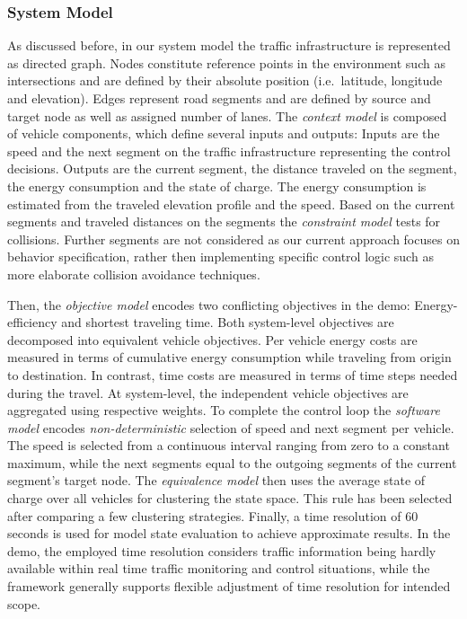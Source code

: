\documentclass[conference]{../cls/IEEEtran}
\begin{document}
\subsubsection*{System Model}

As discussed before, in our system model the traffic infrastructure is
represented as directed graph. Nodes constitute reference points in the
environment such as intersections and are defined by their absolute position
(i.e.\ latitude, longitude and elevation). Edges represent road segments and are
defined by source and target node as well as assigned number of lanes. The
\textit{context model} is composed of vehicle components, which define several
inputs and outputs: Inputs are the speed and the next segment on the traffic
infrastructure representing the control decisions. Outputs are the current
segment, the distance traveled on the segment, the energy consumption and the
state of charge. The energy consumption is estimated from the traveled elevation
profile and the speed. Based on the current segments and traveled distances on
the segments the \textit{constraint model} tests for collisions. Further
segments are not considered as our current approach focuses on behavior
specification, rather then implementing specific control logic such as more elaborate collision
avoidance techniques.

Then, the
\textit{objective model} encodes two conflicting objectives in the demo:
Energy-efficiency and shortest traveling time. Both system-level objectives are decomposed into
equivalent vehicle objectives. Per vehicle energy costs are measured in terms of
cumulative energy consumption while traveling from origin to destination. In
contrast, time costs are measured in terms of time steps needed during the
travel. At system-level, the independent vehicle objectives are aggregated using
respective weights. To complete the control loop the \textit{software model}
encodes \textit{non-deterministic} selection of speed and next segment per
vehicle. The speed is selected from a continuous interval ranging from zero to a
constant maximum, while the next segments equal to the outgoing segments of the
current segment's target node. The \textit{equivalence model} then uses the
average state of charge over all vehicles for clustering the state space. This
rule has been selected after comparing a few clustering strategies. Finally, a
time resolution of 60 seconds is used for model state evaluation to achieve
approximate results. In the demo, the employed time resolution considers
traffic information being hardly available within real time traffic monitoring
and control situations, while the framework generally supports flexible
adjustment of time resolution for intended scope.
\end{document}
